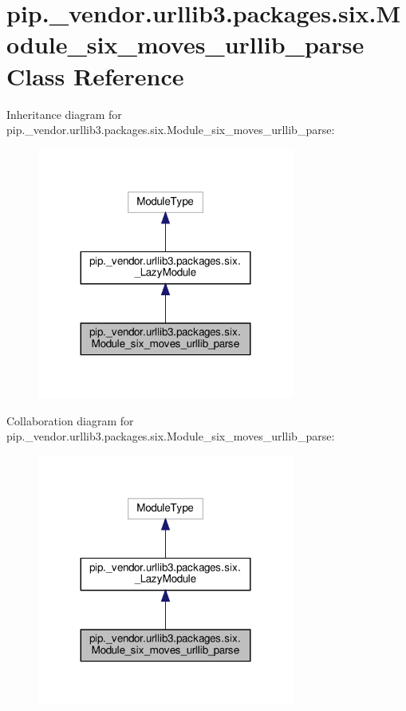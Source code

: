 \hypertarget{classpip_1_1__vendor_1_1urllib3_1_1packages_1_1six_1_1Module__six__moves__urllib__parse}{}\section{pip.\+\_\+vendor.\+urllib3.\+packages.\+six.\+Module\+\_\+six\+\_\+moves\+\_\+urllib\+\_\+parse Class Reference}
\label{classpip_1_1__vendor_1_1urllib3_1_1packages_1_1six_1_1Module__six__moves__urllib__parse}


Inheritance diagram for pip.\+\_\+vendor.\+urllib3.\+packages.\+six.\+Module\+\_\+six\+\_\+moves\+\_\+urllib\+\_\+parse\+:
\nopagebreak
\begin{figure}[H]
\begin{center}
\leavevmode
\includegraphics[width=239pt]{classpip_1_1__vendor_1_1urllib3_1_1packages_1_1six_1_1Module__six__moves__urllib__parse__inherit__graph}
\end{center}
\end{figure}


Collaboration diagram for pip.\+\_\+vendor.\+urllib3.\+packages.\+six.\+Module\+\_\+six\+\_\+moves\+\_\+urllib\+\_\+parse\+:
\nopagebreak
\begin{figure}[H]
\begin{center}
\leavevmode
\includegraphics[width=239pt]{classpip_1_1__vendor_1_1urllib3_1_1packages_1_1six_1_1Module__six__moves__urllib__parse__coll__graph}
\end{center}
\end{figure}
